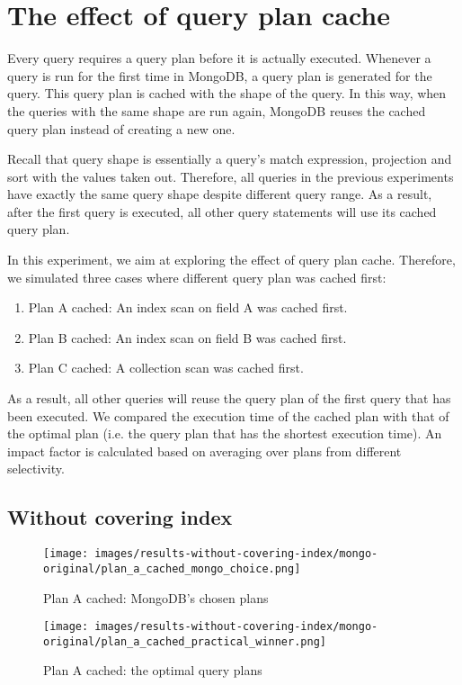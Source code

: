 \clearpage
\section{The effect of query plan cache}
Every query requires a query plan before it is actually executed. Whenever a query is run for the first time in MongoDB, a query plan is generated for the query. This query plan is cached with the shape of the query. In this way, when the queries with the same shape are run again, MongoDB reuses the cached query plan instead of creating a new one. 

Recall that query shape is essentially a query’s match expression, projection and sort with the values taken out. Therefore, all queries in the previous experiments have exactly the same query shape despite different query range. As a result, after the first query is executed, all other query statements will use its cached query plan. 

In this experiment, we aim at exploring the effect of query plan cache. Therefore, we simulated three cases where different query plan was cached first: 
\begin{enumerate}
    \item Plan A cached: An index scan on field A was cached first.
    \item Plan B cached: An index scan on field B was cached first.
    \item Plan C cached: A collection scan was cached first.
\end{enumerate}
As a result, all other queries will reuse the query plan of the first query that has been executed. We compared the execution time of the cached plan with that of the optimal plan (i.e. the query plan that has the shortest execution time). An impact factor is calculated based on averaging over plans from different selectivity.

\subsection{Without covering index}
\begin{figure}[htb]
    \centering
    \texttt{[image: images/results-without-covering-index/mongo-original/plan\_a\_cached\_mongo\_choice.png]}
    \caption{Plan A cached: MongoDB's chosen plans}
    \label{fig:a-cached-v0}
\end{figure}


\begin{figure}[htb]
    \centering
    \texttt{[image: images/results-without-covering-index/mongo-original/plan\_a\_cached\_practical\_winner.png]}
    \caption{Plan A cached: the optimal query plans}
    \label{fig:a-cached-optimal-v0}
\end{figure}


